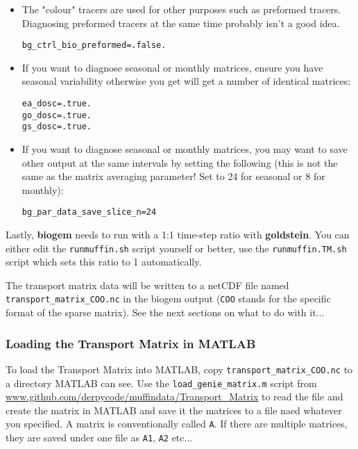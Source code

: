 \documentclass[11pt,fleqn]{book} %
\begin{document}
\begin{itemize}
\vspace{1mm}
\item The "colour" tracers are used for other purposes such as preformed tracers. Diagnosing preformed tracers at the same time probably isn't a good idea.
\begin{verbatim}
bg_ctrl_bio_preformed=.false.
\end{verbatim}
\item If you want to diagnose seasonal or monthly matrices, ensure you have seasonal variability otherwise you get will get a number of identical matrices:
\begin{verbatim}
ea_dosc=.true.
go_dosc=.true.
gs_dosc=.true.
\end{verbatim}
\item If you want to diagnose seasonal or monthly matrices, you may want to save other output at the same intervals by setting the following (this is not the same as the matrix averaging parameter! Set to 24 for seasonal or 8 for monthly):
\begin{verbatim}
bg_par_data_save_slice_n=24
\end{verbatim}
\end{itemize}

\noindent Lastly, \textbf{biogem} needs to run with a 1:1 time-step ratio with \textbf{goldstein}. You can either edit the \texttt{runmuffin.sh} script yourself or better, use the \texttt{runmuffin.TM.sh} script which sets this ratio to 1 automatically. 

The transport matrix data will be written to a netCDF file named \texttt{transport\_matrix\_COO.nc} in the biogem output (\texttt{COO} stands for the specific format of the sparse matrix). See the next sections on what to do with it...


\subsubsection{Loading the Transport Matrix in MATLAB}

To load the Transport Matrix into MATLAB, copy \texttt{transport\_matrix\_COO.nc} to a directory MATLAB can see. Use the  \texttt{load\_genie\_matrix.m}  script from \url{www.github.com/derpycode/muffindata/Transport_Matrix} to read the file and create the matrix in MATLAB and save it the matrices to a file naed whatever you specified. A matrix is conventionally called \texttt{A}. If there are multiple matrices, they are saved under one file as \texttt{A1}, \texttt{A2} etc...
\end{document}
